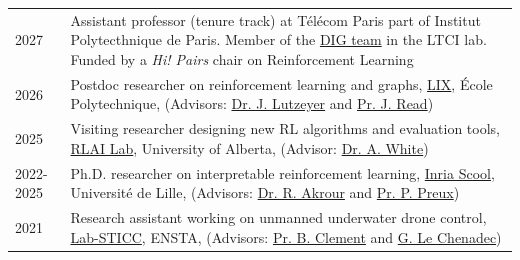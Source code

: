 
\begin{longtable}[l]{@{}p{} p{}}
    2027 & Assistant professor (tenure track) at T\'el\'ecom Paris part of Institut Polytecthnique de Paris. Member of the \href{https://dig.telecom-paris.fr/}{DIG team} in the LTCI lab. Funded by a \textit{Hi! Pairs} chair on Reinforcement Learning\\
    2026 & Postdoc researcher on reinforcement learning and graphs, \href{https://lix.polytechnique.fr}{LIX}, \'Ecole Polytechnique, (Advisors: \href{https://johanneslutzeyer.com/}{Dr. J. Lutzeyer} and \href{https://jmread.github.io/}{Pr. J. Read})\\
    2025 & Visiting researcher designing new RL algorithms and evaluation tools, \href{http://rlai.ualberta.ca/}{RLAI Lab}, University of Alberta, (Advisor: \href{https://cifar.ca/fr/biographie/adam-white/#topskipToContent}{Dr. A. White}) \\
    2022-2025 & Ph.D. researcher on interpretable reinforcement learning, \href{https://team.inria.fr/scool/}{Inria Scool}, Universit\'e de Lille, (Advisors: \href{https://akrouriad.github.io/}{Dr. R. Akrour} and \href{https://philippe-preux.codeberg.page/}{Pr. P. Preux})\\
    2021 & Research assistant working on unmanned underwater drone control, \href{https://www.ensta-bretagne.fr/fr/recherche-en-technologies-de-linformation-et-de-la-communication-lab-sticc}{Lab-STICC}, ENSTA, (Advisors: \href{https://www.ensta-bretagne.fr/clement/}{Pr. B. Clement} and \href{https://www.ensta-bretagne.fr/fr/annuaire/gilles.le.chenadec}{G. Le Chenadec})
\end{longtable}